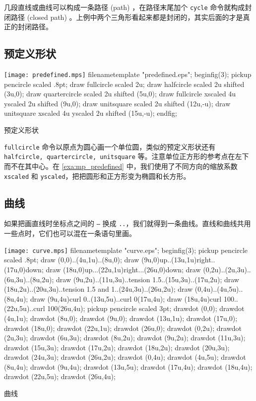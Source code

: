 几段直线或曲线可以构成一条路径 (path) ，在路径末尾加个 \texttt{cycle} 命令就构成封闭路径 (closed path) 。上例中两个三角形看起来都是封闭的，其实后面的才是真正的封闭路径。

\subsection{预定义形状}

\begin{example}[htbp]
\begin{FBTDemo}[numbers=left]{\texttt{[image: predefined.mps]}}
filenametemplate "predefined.eps";
beginfig(3);
pickup pencircle scaled .8pt;
draw fullcircle scaled 2u;
draw halfcircle scaled 2u shifted (3u,0);
draw quartercircle scaled 2u shifted (5u,0);
draw fullcircle xscaled 4u yscaled 2u shifted (9u,0);
draw unitsquare scaled 2u shifted (12u,-u);
draw unitsquare xscaled 4u yscaled 2u shifted (15u,-u);
endfig;
\end{FBTDemo}
\caption{\MP 预定义形状}
\label{exa:mp_predefined}
\end{example}

\texttt{fullcircle} 命令以原点为圆心画一个单位圆，类似的预定义形状还有 \texttt{halfcircle, quartercircle, unitsquare} 等。注意单位正方形的参考点在左下而不在其中心。在 \autoref{exa:mp_predefined} 中，我们使用了不同方向的缩放系数 \texttt{xscaled} 和 \texttt{yscaled}，把把圆形和正方形变为椭圆和长方形。

\subsection{曲线}

如果把画直线时坐标点之间的 \texttt{--} 换成 \texttt{..}，我们就得到一条曲线。直线和曲线共用一些点时，它们也可以混在一条语句里画。

\begin{example}[htbp]
\begin{FBTDemo}[numbers=left]{\texttt{[image: curve.mps]}}
filenametemplate "curve.eps";
beginfig(3);
pickup pencircle scaled .8pt;
draw (0,0)..(4u,1u)..(8u,0);
draw (9u,0){up}..(13u,1u){right}..(17u,0){down};
draw (18u,0){up}...(22u,1u){right}...(26u,0){down};
draw (0,2u)..(2u,3u)..(6u,3u)..(8u,2u);
draw (9u,2u)..(11u,3u)..tension 1.5..(15u,3u)..(17u,2u);
draw (18u,2u)..(20u,3u)..tension 1.5 
  and 1..(24u,3u)..(26u,2u);
draw (0,4u)..(4u,5u)..(8u,4u);
draw (9u,4u){curl 0}..(13u,5u)..{curl 0}(17u,4u);
draw (18u,4u){curl 100}..(22u,5u)..{curl 100}(26u,4u);
pickup pencircle scaled 3pt;
drawdot (0,0); drawdot (4u,1u); drawdot (8u,0);
drawdot (9u,0); drawdot (13u,1u); drawdot (17u,0);
drawdot (18u,0); drawdot (22u,1u); drawdot (26u,0);
drawdot (0,2u); drawdot (2u,3u); drawdot (6u,3u); 
  drawdot (8u,2u);
drawdot (9u,2u); drawdot (11u,3u); drawdot (15u,3u); 
  drawdot (17u,2u);
drawdot (18u,2u); drawdot (20u,3u); drawdot (24u,3u); 
  drawdot (26u,2u);
drawdot (0,4u); drawdot (4u,5u); drawdot (8u,4u);
drawdot (9u,4u); drawdot (13u,5u); drawdot (17u,4u);
drawdot (18u,4u); drawdot (22u,5u); drawdot (26u,4u);
\end{FBTDemo}
\caption{\MP 曲线}
\label{exa:mp_curve}
\end{example}

